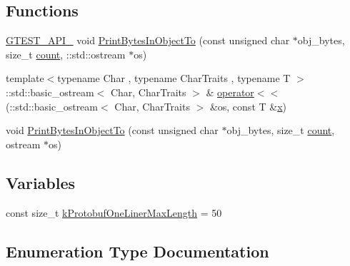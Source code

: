 \subsection*{Functions}
\begin{DoxyCompactItemize}
\item 
\mbox{\hyperlink{_obj__test_2lib_2googletest-release-1_88_81_2googletest_2include_2gtest_2internal_2gtest-port_8h_aa73be6f0ba4a7456180a94904ce17790}{G\+T\+E\+S\+T\+\_\+\+A\+P\+I\+\_\+}} void \mbox{\hyperlink{namespacetesting_1_1internal2_a9fbf8e07c0f94dc74d6ef5e56cd3c553}{Print\+Bytes\+In\+Object\+To}} (const unsigned char $\ast$obj\+\_\+bytes, size\+\_\+t \mbox{\hyperlink{_obj__test_2lib_2googletest-release-1_88_81_2googlemock_2test_2gmock__stress__test_8cc_afd9db40e3361ae09188795e8cbe19752}{count}}, \+::std\+::ostream $\ast$os)
\item 
{\footnotesize template$<$typename Char , typename Char\+Traits , typename T $>$ }\\\+::std\+::basic\+\_\+ostream$<$ Char, Char\+Traits $>$ \& \mbox{\hyperlink{namespacetesting_1_1internal2_a07dbe129beb8952074f04b599dfce39b}{operator$<$$<$}} (\+::std\+::basic\+\_\+ostream$<$ Char, Char\+Traits $>$ \&os, const T \&\mbox{\hyperlink{_obj__test_2lib_2googletest-master_2googlemock_2test_2gmock-matchers__test_8cc_a6150e0515f7202e2fb518f7206ed97dc}{x}})
\item 
void \mbox{\hyperlink{namespacetesting_1_1internal2_abfb9aa80365f93b952e9a4bea09947a8}{Print\+Bytes\+In\+Object\+To}} (const unsigned char $\ast$obj\+\_\+bytes, size\+\_\+t \mbox{\hyperlink{_obj__test_2lib_2googletest-release-1_88_81_2googlemock_2test_2gmock__stress__test_8cc_afd9db40e3361ae09188795e8cbe19752}{count}}, ostream $\ast$os)
\end{DoxyCompactItemize}
\subsection*{Variables}
\begin{DoxyCompactItemize}
\item 
const size\+\_\+t \mbox{\hyperlink{namespacetesting_1_1internal2_a140c8efd51e63a3def98445bff107518}{k\+Protobuf\+One\+Liner\+Max\+Length}} = 50
\end{DoxyCompactItemize}


\subsection{Enumeration Type Documentation}
\mbox{\label{namespacetesting_1_1internal2_aeb8161b0b3ee503347b0662d7028fd57}} 
